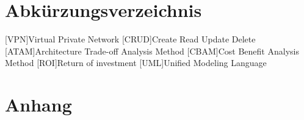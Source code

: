 \documentclass[Master,MSE,german]{twbook}
\newcommand{\listofcode}{\phantomsection\lstlistoflistings}
\begin{document}
\clearpage


\clearpage

\listoffigures
\clearpage

\listoftables
\clearpage

\listofcode
\clearpage

{}
\chapter*{Abkürzungsverzeichnis}
\begin{acronym}[XXXXX]
    [VPN]{Virtual Private Network}
    [CRUD]{Create Read Update Delete}
    [ATAM]{Architecture Trade-off Analysis Method}
    [CBAM]{Cost Benefit Analysis Method}
    [ROI]{Return of investment}
    [UML]{Unified Modeling Language}
\end{acronym}
\clearpage

{}
\chapter*{Anhang}
\end{document}
